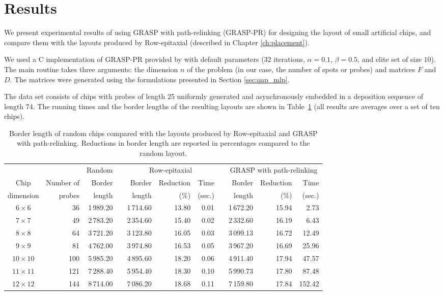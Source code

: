 \section{Results}
\label{sec:qap_results}

We present experimental results of using GRASP with path-relinking (GRASP-PR)
for designing the layout of small artificial chips, and compare them with the
layouts produced by Row-epitaxial (described in Chapter \ref{ch:placement}).

We used a C implementation of GRASP-PR provided by \citet{Oliveira2004} with
default parameters (32 iterations, $\alpha=0.1$, $\beta=0.5$, and elite set of
size $10$). The main routine takes three arguments: the dimension $n$ of the
problem (in our case, the number of spots or probes) and matrices $F$ and $D$.
The matrices were generated using the formulations presented in Section
\ref{sec:qap_mlp}.

The data set consists of chips with probes of length 25 uniformly generated and
asynchronously embedded in a deposition sequence of length 74. The running times
and the border lengths of the resulting layouts are shown in
Table~\ref{tab:graspr_reptx_bl} (all results are averages over a set of ten
chips).

\begin{table}[t]
\caption{\label{tab:graspr_reptx_bl}
  Border length of random chips compared with the layouts produced by
  Row-epitaxial and GRASP with path-relinking. Reductions in border length are
  reported in percentages compared to the random layout.}
\scriptsize{
\begin{tabular}{crrcrrrcrrr}
          &            & Random & & \multicolumn{3}{c}{Row-epitaxial}  & & \multicolumn{3}{c}{GRASP with path-relinking}  \\ \cline{3-3} \cline{5-7} \cline{9-11}
Chip      & Number of  & Border & & Border & Reduction & Time          & & Border & Reduction & Time   \\
dimension & probes     & length & & length & (\%)      & (sec.)        & & length & (\%)      & (sec.) \\
\hline
$6\times 6$   &  36 & 1\,989.20 & & 1\,714.60 & 13.80 & 0.01 & & 1\,672.20 & 15.94 &   2.73 \\
$7\times 7$   &  49 & 2\,783.20 & & 2\,354.60 & 15.40 & 0.02 & & 2\,332.60 & 16.19 &   6.43 \\
$8\times 8$   &  64 & 3\,721.20 & & 3\,123.80 & 16.05 & 0.03 & & 3\,099.13 & 16.72 &  12.49 \\
$9\times 9$   &  81 & 4\,762.00 & & 3\,974.80 & 16.53 & 0.05 & & 3\,967.20 & 16.69 &  25.96 \\
$10\times 10$ & 100 & 5\,985.20 & & 4\,895.60 & 18.20 & 0.06 & & 4\,911.40 & 17.94 &  47.57 \\
$11\times 11$ & 121 & 7\,288.40 & & 5\,954.40 & 18.30 & 0.10 & & 5\,990.73 & 17.80 &  87.48 \\
$12\times 12$ & 144 & 8\,714.00 & & 7\,086.20 & 18.68 & 0.11 & & 7\,159.80 & 17.84 & 152.42 \\
\hline
\end{tabular}}
\end{table}


